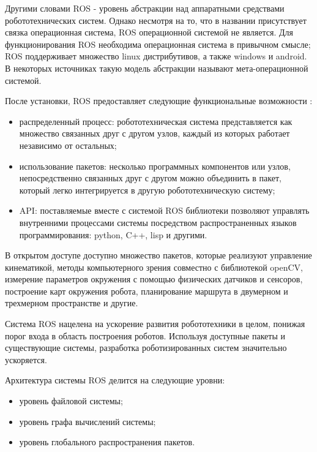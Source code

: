 \documentclass[oneside,final,14pt]{extreport}
\newcommand{\indentSpace}{1.25cm}
\begin{document}
Другими словами ROS -  уровень абстракции над аппаратными средствами робототехнических систем. Однако несмотря на то, что в названии присутствует связка операционная система, ROS операционной системой не является. Для функционирования ROS необходима операционная система в привычном смысле; ROS поддерживает множество linux дистрибутивов, а также windows и android.  В некоторых источниках такую модель абстракции называют мета-операционной системой.

После установки, ROS предоставляет следующие функциональные возможности \cite{RosBookTurtle}: 
\begin{itemize}
\item распределенный процесс: робототехническая система представляется как множество связанных друг с другом узлов, каждый из которых работает независимо от остальных;

\item использование пакетов: несколько программных компонентов или узлов, непосредственно связанных друг с другом можно объединить в пакет, который легко интегрируется в другую робототехническую систему;
\item API: поставляемые вместе с системой ROS библиотеки позволяют управлять внутренними процессами системы посредством распространенных языков программирования: python, C++, lisp и другими.
\end{itemize}

В открытом доступе доступно множество пакетов, которые реализуют управление кинематикой, методы компьютерного зрения совместно с библиотекой openCV, измерение параметров окружения с помощью физических датчиков и сенсоров, построение карт окружения робота, планирование маршрута в двумерном и трехмерном пространстве и другие.

Система ROS нацелена на ускорение развития робототехники в целом, понижая порог входа в область построения роботов. Используя доступные пакеты и существующие системы, разработка роботизированных систем значительно ускоряется. 

Архитектура системы ROS делится на следующие уровни:
\begin{itemize}
\item уровень файловой системы;
\item уровень графа вычислений системы;
\item уровень глобального распространения пакетов.
\end{itemize}
\end{document}
